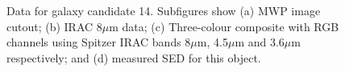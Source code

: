 \documentclass[times,usenatbib]{mn2e}
\begin{document}
\begin{figure}
\begin{center}
\caption{Data for galaxy candidate 14. Subfigures show (a) MWP image cutout; (b) IRAC 8$\mu$m data; (c) Three-colour composite with RGB channels using Spitzer IRAC bands 8$\mu$m, 4.5$\mu$m and 3.6$\mu$m respectively; and (d) measured SED for this object.}
\label{gal14}
\end{center}
\end{figure} 
\end{document}
